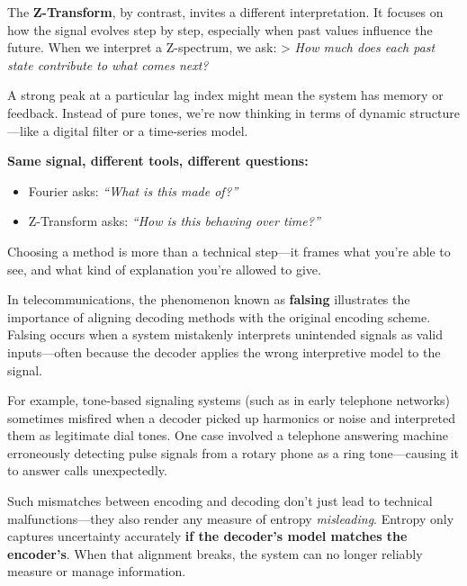 The \textbf{Z-Transform}, by contrast, invites a different interpretation. It focuses on how the signal evolves step by step, especially when past values influence the future. When we interpret a Z-spectrum, we ask:  
> \textit{How much does each past state contribute to what comes next?}

A strong peak at a particular lag index might mean the system has memory or feedback. Instead of pure tones, we’re now thinking in terms of dynamic structure—like a digital filter or a time-series model.

\medskip

\noindent
\textbf{Same signal, different tools, different questions:}

\begin{itemize}
  \item Fourier asks: \textit{“What is this made of?”}
  \item Z-Transform asks: \textit{“How is this behaving over time?”}
\end{itemize}

Choosing a method is more than a technical step—it frames what you’re able to see, and what kind of explanation you’re allowed to give.

\begin{tcolorbox}[title={\textbf{Historical Footnote: The Perils of Mismatched Decoding}}, colback=gray!5, colframe=black, fonttitle=\bfseries]

  In telecommunications, the phenomenon known as \textbf{falsing} illustrates the importance of aligning decoding methods with the original encoding scheme. Falsing occurs when a system mistakenly interprets unintended signals as valid inputs—often because the decoder applies the wrong interpretive model to the signal.

  \medskip
  
  For example, tone-based signaling systems (such as in early telephone networks) sometimes misfired when a decoder picked up harmonics or noise and interpreted them as legitimate dial tones. One case involved a telephone answering machine erroneously detecting pulse signals from a rotary phone as a ring tone—causing it to answer calls unexpectedly.

  \medskip
  
  Such mismatches between encoding and decoding don't just lead to technical malfunctions—they also render any measure of entropy \emph{misleading}. Entropy only captures uncertainty accurately \textbf{if the decoder's model matches the encoder's}. When that alignment breaks, the system can no longer reliably measure or manage information.
  
\end{tcolorbox}



